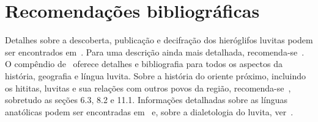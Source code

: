 \begin{center}
\end{center}

\chapter{Recomendações bibliográficas}

Detalhes sobre a descoberta, publicação e decifração dos hieróglifos luvitas
podem ser encontrados em~\citet[pp. 131ff.]{HawkinsScripts}. Para uma descrição
ainda mais detalhada, recomenda-se~\citet[pp. 6-17]{CHLI11}.
O compêndio de~\citet{Melchert2003} oferece detalhes e bibliografia para todos
os aspectos da história, geografia e língua luvita.
Sobre a história do oriente próximo, incluindo os hititas, luvitas e sua
relações com outros povos da região, recomenda-se~\citet{Mieroop2015}, sobretudo
as seções 6.3, 8.2 e 11.1.
Informações detalhadas sobre as línguas anatólicas podem ser encontradas
em~\citet[239--308]{HSK41.1} e, sobre a dialetologia do luvita,
ver~\citet{Yakubovich2010}.



